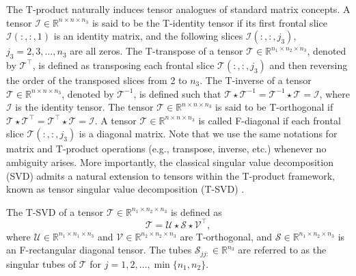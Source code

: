 \documentclass[onefignum,onetabnum]{siamart250211}
\begin{document}
The T-product naturally induces tensor analogues of standard matrix concepts. A tensor $\mathscr{I}\in \mathbb{R}^{n\times n \times n_3}$ is said to be the T-identity tensor if its first frontal slice $\mathscr{I}(:,:,1)$ is an identity matrix, and the following slices $\mathscr{I}(:,:,j_3)$,  $j_3 = 2,3,\dots, n_3$ are all zeros.  The T-transpose of a tensor $\mathscr{T} \in \mathbb{R}^{n_1 \times n_2 \times n_3}$, denoted by $\mathscr{T}^\top$, is defined as transposing each frontal slice $\mathscr{T}(:,:,j_3)$ and then reversing the order of the transposed slices from 2 to $n_3$. The T-inverse of a tensor $\mathscr{T} \in \mathbb{R}^{n \times n \times n_3}$, denoted by $\mathscr{T}^{-1}$, is defined such that $\mathscr{T} \star \mathscr{T}^{-1} = \mathscr{T}^{-1} \star \mathscr{T} = \mathscr{I}$, where $\mathscr{I}$ is the identity tensor. The tensor $\mathscr{T} \in \mathbb{R}^{n \times n \times n_3}$ is said to be T-orthogonal if $\mathscr{T} \star \mathscr{T}^\top = \mathscr{T}^\top \star \mathscr{T} = \mathscr{I}$. A tensor $\mathscr{T} \in \mathbb{R}^{n \times n \times n_3}$ is called F-diagonal if each frontal slice $\mathscr{T}(:,:,j_3)$ is a diagonal matrix. Note that we use the same notations for matrix and T-product
operations (e.g., transpose, inverse, etc.)
whenever no ambiguity arises. More importantly,  the classical singular value decomposition (SVD) admits a natural extension to tensors within the T-product framework, known as  tensor singular value decomposition (T-SVD) \cite{zhang2018randomized,zhang2016exact}.

\begin{definition}[T-SVD]
The T-SVD of a tensor $\mathscr{T}\in\mathbb{R}^{n_1\times n_2\times n_3}$ is defined as
\begin{equation}
\mathscr{T}=\mathscr{U}\star\mathscr{S}\star\mathscr{V}^{\top},
\end{equation}
where $\mathscr{U}\in\mathbb{R}^{n_1\times n_1\times n_3}$ and $\mathscr{V}\in\mathbb{R}^{n_2\times n_2\times n_3}$ are T-orthogonal, and $\mathscr{S}\in\mathbb{R}^{n_1\times n_2\times n_3}$ is an F-rectangular diagonal tensor. The tubes $\mathscr{S}_{jj:}\in\mathbb{R}^{n_3}$ are referred to as the singular tubes of $\mathscr{T}$ for $j=1,2,\dots,\min{\{n_1,n_2\}}$.
\end{definition}
\end{document}
